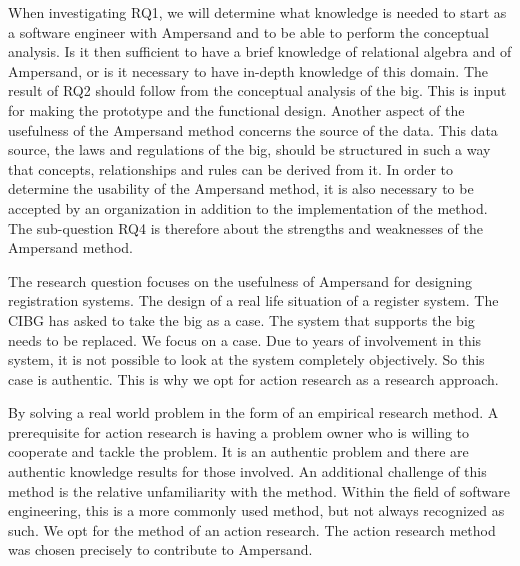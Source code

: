 When investigating RQ1, we will determine what knowledge is needed to start as a software engineer with Ampersand and to be able to perform the conceptual analysis.
Is it then sufficient to have a brief knowledge of relational algebra and of Ampersand, or is it necessary to have in-depth knowledge of this domain.
The result of RQ2 should follow from the conceptual analysis of the \acrshort{big}.
This is input for making the prototype and the functional design.
Another aspect of the usefulness of the Ampersand method concerns the source of the data.
This data source, the laws and regulations of the \acrshort{big}, should be structured in such a way that concepts, relationships and rules can be derived from it.
In order to determine the usability of the Ampersand method, it is also necessary to be accepted by an organization in addition to the implementation of the method.
The sub-question RQ4 is therefore about the strengths and weaknesses of the Ampersand method.



\begin{comment}
\item[RQ1]- What knowledge is necessary for using Ampersand.
\item[RQ2]- What are the concepts and relationships in the new law big.
\item[RQ3]- Are the results useful for the CIBG organization.
\item[RQ4]- Is the description of the legislation and regulations, set up in such a way that this legislation can be used for the Ampersand method.

doel van H3 -> verantwoording van de aanpak; 
aantekeningen op papier, overnemen van de data, leesbaar maken van de observaties, generaliseren (clusteren)
\end{comment}


The research question focuses on the usefulness of Ampersand for designing registration systems.
The design of a real life situation of a register system.
The CIBG has asked to take the \acrshort{big} as a case.
The system that supports the \acrshort{big} needs to be replaced.
We focus on a case.
Due to years of involvement in this system, it is not possible to look at the system completely objectively.
So this case is authentic.
This is why we opt for action research as a research approach.

By solving a real world problem in the form of an empirical research method.
A prerequisite for action research is having a problem owner who is willing to cooperate and tackle the problem.
It is an authentic problem and there are authentic knowledge results for those involved.
An additional challenge of this method is the relative unfamiliarity with the method.
Within the field of software engineering, this is a more commonly used method, but not always recognized as such.
We opt for the method of an action research.
The action research\citep{Easterbrook} method was chosen precisely to contribute to Ampersand.

